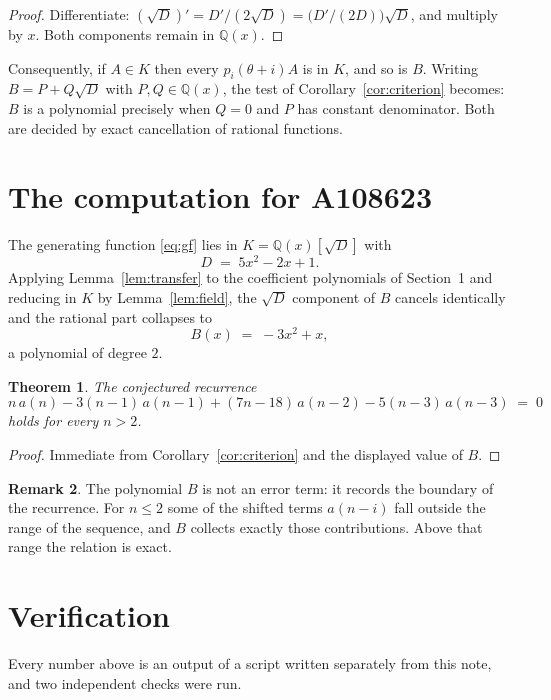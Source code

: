 \documentclass[11pt,a4paper]{article}
\theoremstyle{plain}
\newtheorem{theorem}{Theorem}
\theoremstyle{definition}
\newtheorem{remark}[theorem]{Remark}
\begin{document}
\begin{proof}
Differentiate: $(\sqrt{D})'=D'/(2\sqrt{D})=\bigl(D'/(2D)\bigr)\sqrt{D}$, and multiply by
$x$. Both components remain in $\mathbb{Q}(x)$.
\end{proof}

Consequently, if $A\in K$ then every $p_{i}(\theta+i)A$ is in $K$, and so is $B$. Writing
$B=P+Q\sqrt{D}$ with $P,Q\in\mathbb{Q}(x)$, the test of Corollary~\ref{cor:criterion}
becomes: $B$ is a polynomial precisely when $Q=0$ and $P$ has constant denominator. Both
are decided by exact cancellation of rational functions.

\section{The computation for A108623}

The generating function \eqref{eq:gf} lies in $K=\mathbb{Q}(x)[\sqrt{D}]$ with
\[
D \;=\; 5 x^{2} - 2 x + 1 .
\]
Applying Lemma~\ref{lem:transfer} to the coefficient polynomials of Section~1 and reducing
in $K$ by Lemma~\ref{lem:field}, the $\sqrt{D}$ component of $B$ cancels identically and
the rational part collapses to
\[
B(x)\;=\;- 3 x^{2} + x ,
\]
a polynomial of degree $2$.

\begin{theorem}
The conjectured recurrence
\[
n\,a(n) -  3 \left(n - 1\right)\,a(n-1) + (7 n - 18)\,a(n-2) -  5 \left(n - 3\right)\,a(n-3) \;=\;0
\]
holds for every $n>2$.
\end{theorem}

\begin{proof}
Immediate from Corollary~\ref{cor:criterion} and the displayed value of $B$.
\end{proof}

\begin{remark}
The polynomial $B$ is not an error term: it records the boundary of the recurrence. For
$n\le2$ some of the shifted terms $a(n-i)$ fall outside the range of the sequence,
and $B$ collects exactly those contributions. Above that range the relation is exact.
\end{remark}

\section{Verification}

Every number above is an output of a script written separately from this note, and two
independent checks were run.
\end{document}
